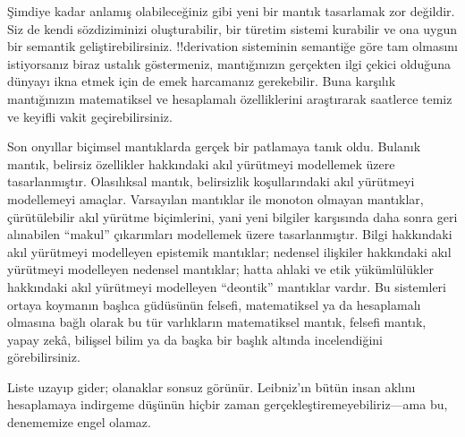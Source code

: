 \documentclass[../../../include/open-logic-section]{subfiles}
\begin{document}


Şimdiye kadar anlamış olabileceğiniz gibi yeni bir mantık tasarlamak zor
değildir. Siz de kendi sözdiziminizi oluşturabilir, bir türetim sistemi
kurabilir ve ona uygun bir semantik geliştirebilirsiniz. !!{derivation}
sisteminin semantiğe göre tam olmasını istiyorsanız biraz ustalık göstermeniz,
mantığınızın gerçekten ilgi çekici olduğuna dünyayı ikna etmek için de emek
harcamanız gerekebilir. Buna karşılık mantığınızın matematiksel ve hesaplamalı
özelliklerini araştırarak saatlerce temiz ve keyifli vakit geçirebilirsiniz.

Son onyıllar biçimsel mantıklarda gerçek bir patlamaya tanık oldu. Bulanık
mantık, belirsiz özellikler hakkındaki akıl yürütmeyi modellemek üzere
tasarlanmıştır. Olasılıksal mantık, belirsizlik koşullarındaki akıl yürütmeyi
modellemeyi amaçlar. Varsayılan mantıklar ile monoton olmayan mantıklar,
çürütülebilir akıl yürütme biçimlerini, yani yeni bilgiler karşısında daha
sonra geri alınabilen ``makul'' çıkarımları modellemek üzere tasarlanmıştır.
Bilgi hakkındaki akıl yürütmeyi modelleyen epistemik mantıklar; nedensel
ilişkiler hakkındaki akıl yürütmeyi modelleyen nedensel mantıklar; hatta ahlaki
ve etik yükümlülükler hakkındaki akıl yürütmeyi modelleyen ``deontik''
mantıklar vardır. Bu sistemleri ortaya koymanın başlıca güdüsünün felsefi,
matematiksel ya da hesaplamalı olmasına bağlı olarak bu tür varlıkların
matematiksel mantık, felsefi mantık, yapay zekâ, bilişsel bilim ya da başka bir
başlık altında incelendiğini görebilirsiniz.

Liste uzayıp gider; olanaklar sonsuz görünür. Leibniz'ın bütün insan aklını
hesaplamaya indirgeme düşünün hiçbir zaman gerçekleştiremeyebiliriz---ama bu,
denememize engel olamaz.
\end{document}
